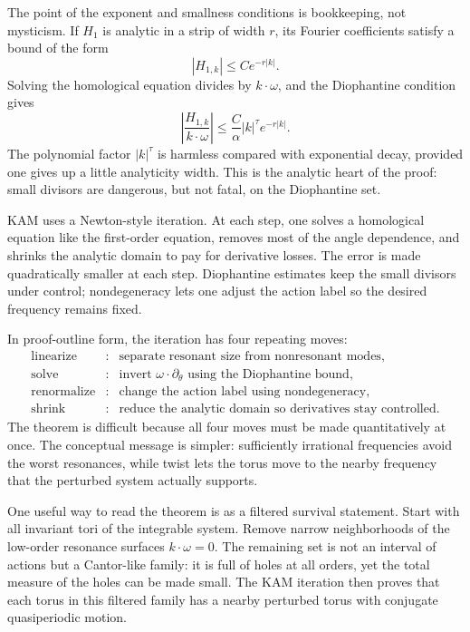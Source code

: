 The point of the exponent and smallness conditions is bookkeeping, not
mysticism. If \(H_1\) is analytic in a strip of width \(r\), its Fourier
coefficients satisfy a bound of the form
\[
  |H_{1,k}|\leq C e^{-r|k|}.
\]
Solving the homological equation divides by \(k\cdot\omega\), and the
Diophantine condition gives
\[
  \left|\frac{H_{1,k}}{k\cdot\omega}\right|
  \leq
  \frac{C}{\alpha}|k|^\tau e^{-r|k|}.
\]
The polynomial factor \(|k|^\tau\) is harmless compared with exponential
decay, provided one gives up a little analyticity width. This is the analytic
heart of the proof: small divisors are dangerous, but not fatal, on the
Diophantine set.

KAM uses a Newton-style iteration. At each step, one solves a homological
equation like the first-order equation, removes most of the angle dependence,
and shrinks the analytic domain to pay for derivative losses. The error is made
quadratically smaller at each step. Diophantine estimates keep the small
divisors under control; nondegeneracy lets one adjust the action label so the
desired frequency remains fixed.

In proof-outline form, the iteration has four repeating moves:
\[
\begin{array}{rcl}
\text{linearize} &:& \text{separate resonant size from nonresonant modes},\\
\text{solve} &:& \text{invert } \omega\cdot\partial_\theta
    \text{ using the Diophantine bound},\\
\text{renormalize} &:& \text{change the action label using nondegeneracy},\\
\text{shrink} &:& \text{reduce the analytic domain so derivatives stay controlled}.
\end{array}
\]
The theorem is difficult because all four moves must be made quantitatively at
once. The conceptual message is simpler: sufficiently irrational frequencies
avoid the worst resonances, while twist lets the torus move to the nearby
frequency that the perturbed system actually supports.

One useful way to read the theorem is as a filtered survival statement. Start
with all invariant tori of the integrable system. Remove narrow neighborhoods
of the low-order resonance surfaces \(k\cdot\omega=0\). The remaining set is
not an interval of actions but a Cantor-like family: it is full of holes at all
orders, yet the total measure of the holes can be made small. The KAM iteration
then proves that each torus in this filtered family has a nearby perturbed
torus with conjugate quasiperiodic motion.


